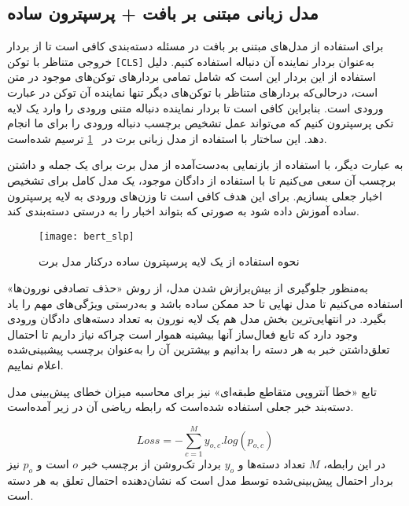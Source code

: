 
\subsection{مدل زبانی مبتنی بر بافت + پرسپترون ساده}
برای استفاده از مدل‌‌های مبتنی بر بافت در مسئله دسته‌بندی کافی است تا از بردار خروجی متناظر با توکن \verb|[CLS]| به‌عنوان بردار نماینده آن دنباله استفاده کنیم. دلیل استفاده از این بردار این است که شامل تمامی بردارهای توکن‌های موجود در متن است، درحالی‌که بردارهای متناظر با توکن‌های دیگر تنها نماینده آن توکن در عبارت ورودی است. بنابراین کافی است تا بردار نماینده دنباله متنی ورودی را وارد یک لایه تکی پرسپترون کنیم که می‌تواند عمل تشخیص برچسب دنباله ورودی را برای ما انجام دهد. این ساختار با استفاده از مدل زبانی برت در \figurename~\ref{fig.bertSLP} ترسیم شده‌است.

به عبارت دیگر، با استفاده از بازنمایی به‌دست‌آمده از مدل برت برای یک جمله و داشتن برچسب آن سعی می‌کنیم تا با استفاده از  دادگان موجود، یک مدل کامل برای تشخیص اخبار جعلی بسازیم. برای این هدف کافی است تا وزن‌های ورودی به لایه پرسپترون  ساده آموزش داده شود به صورتی که بتواند اخبار را به درستی دسته‌بندی کند. 

\begin{figure}[!h]
\texttt{[image: bert\_slp]}
\centering
\caption{نحوه استفاده از یک لایه پرسپترون ساده درکنار مدل برت}
\label{fig.bertSLP}
\end{figure}
\noindent

به‌منظور جلوگیری از بیش‌برازش شدن مدل، از روش «حذف تصادفی نورون‌ها» استفاده می‌کنیم تا مدل نهایی تا حد ممکن ساده باشد و به‌درستی ویژگی‌های مهم را یاد بگیرد. در انتهایی‌ترین بخش مدل هم یک لایه نورون به تعداد دسته‌های دادگان ورودی وجود دارد که تابع فعال‌ساز آنها بیشینه هموار است چراکه نیاز داریم تا احتمال تعلق‌داشتن خبر به هر دسته را بدانیم و بیشترین آن را به‌عنوان برچسب پیشبینی‌شده اعلام نماییم.

تابع «خطا آنتروپی متقاطع طبقه‌ای» نیز برای محاسبه میزان خطای پیش‌بینی مدل دسته‌بند خبر جعلی استفاده شده‌است که رابطه ریاضی آن در زیر آمده‌است.

\begin{equation}
Loss = - \sum_{c=1}^{M}y_{o,c} . log(p_{o,c})
\end{equation}
در این رابطه، $M$ تعداد دسته‌ها و $y_o$ بردار تک‌روشن از برچسب خبر $o$ است و $p_o$ نیز بردار احتمال پیش‌بینی‌شده توسط مدل است که نشان‌دهنده احتمال تعلق به هر دسته است.

